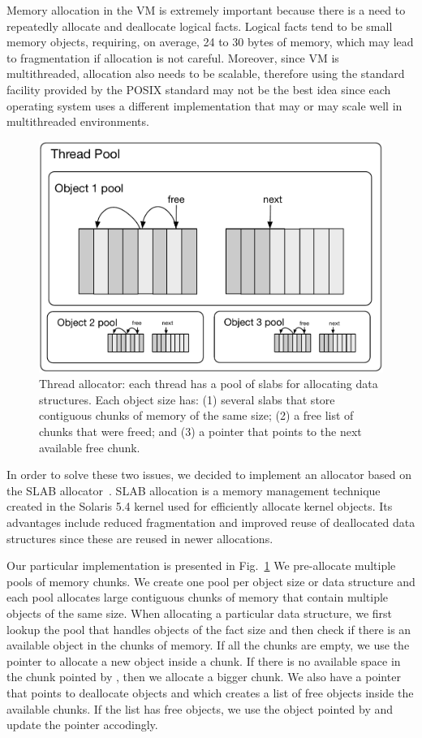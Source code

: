 
Memory allocation in the VM is extremely important because there is a need to
repeatedly allocate and deallocate logical facts. Logical facts tend to be small
memory objects, requiring, on average, 24 to 30 bytes of memory, which may lead
to fragmentation if allocation is not careful.  Moreover, since VM is
multithreaded, allocation also needs to be scalable, therefore using the
standard  facility provided by the POSIX standard may not be the
best idea since each operating system uses a different implementation that may
or may scale well in multithreaded environments.

\begin{figure}[ht]
   \begin{center}
      \includegraphics[width=0.7\linewidth]{figures/implementation/pool.pdf}
   \end{center}
   \caption{Thread allocator: each thread has a pool of slabs for allocating
      data structures. Each object size has: (1) several slabs that store contiguous chunks of
      memory of the same size; (2) a free list  of chunks that were freed; and (3) a  pointer that points to the next available free chunk.}
   \label{fig:implementation:pool}
\end{figure}

In order to solve these two issues, we decided to implement an allocator based
on the SLAB allocator~\cite{Bonwick-94}. SLAB allocation is a memory management
technique created in the Solaris 5.4 kernel used for efficiently allocate kernel
objects. Its advantages include reduced fragmentation and improved reuse of
deallocated data structures since these are reused in newer allocations.

Our particular implementation is presented in Fig.~\ref{fig:implementation:pool}
We pre-allocate multiple pools of memory chunks. We create one pool per object
size or data structure and each pool allocates large contiguous chunks of memory
that contain multiple objects of the same size. When allocating a particular
data structure, we first lookup the pool that
handles objects of the fact size and then check if there is an available object
in the chunks of memory. If all the chunks are empty, we use the 
pointer to allocate a new object inside a chunk. If there is no available space
in the chunk pointed by , then we allocate a bigger chunk. We also
have a pointer  that points to deallocate objects and which creates a
list of free objects inside the available chunks. If the list has free objects,
we use the object pointed by  and update the  pointer
accodingly.

